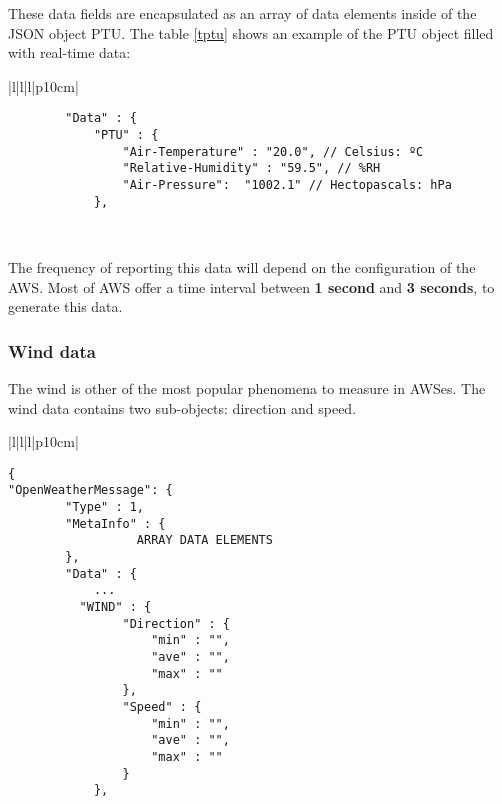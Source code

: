 These data fields are encapsulated as an array of data elements inside of the \gls{JSON} object \gls{PTU}. The table \ref{tptu} shows an example of the \gls{PTU} object filled with real-time data:

\begin{table}[H]
\centering
\begin{tabular}{|l|l|l|p{10cm}|}
\hline
\begin{minipage}[t]{\linewidth}
	\begin{verbatim}
        "Data" : {
            "PTU" : {
                "Air-Temperature" : "20.0", // Celsius: ºC
                "Relative-Humidity" : "59.5", // %RH 
                "Air-Pressure":  "1002.1" // Hectopascals: hPa
            },
      \end{verbatim}
\end{minipage} \\
\hline
\end{tabular}
\caption{PTU data field with real-time data in a data message of OpenWeather protocol.}
\label{tptu}
\end{table}

The frequency of reporting this data will depend on the configuration of the \gls{AWS}. Most of \gls{AWS} offer a time interval between \textbf{1 second} and \textbf{3 seconds}, to generate this data.

\subsubsection{Wind data}

The wind is other of the most popular phenomena to measure in \gls{AWS}es. The wind data contains two sub-objects: direction and speed. 
\begin{table}[H]
\centering
\begin{tabular}{|l|l|l|p{10cm}|}
\hline
\begin{minipage}[t]{\linewidth}
	\begin{verbatim}
{
"OpenWeatherMessage": {
        "Type" : 1,
        "MetaInfo" : {
	              ARRAY DATA ELEMENTS
        },
        "Data" : {
            ...
          "WIND" : {
                "Direction" : {
                    "min" : "",
                    "ave" : "",
                    "max" : ""
                },
                "Speed" : { 
                    "min" : "",
                    "ave" : "",
                    "max" : ""
                }
            },
      \end{verbatim}
\end{minipage} \\
\hline
\end{tabular}
\caption{Wind data field in a data message of OpenWeather protocol.}
\end{table}

